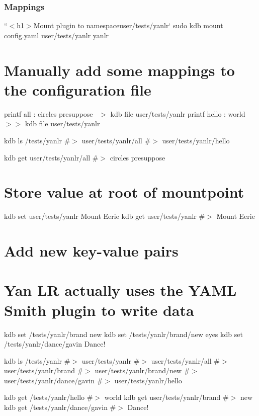 \subsubsection*{Mappings}

``{\ttfamily  $<$h1$>$Mount plugin to namespace}user/tests/yanlr` sudo kdb mount config.\+yaml user/tests/yanlr yanlr

\section*{Manually add some mappings to the configuration file}

printf \textquotesingle{}all \+: circles presuppose~\newline
\textquotesingle{} $>$ {\ttfamily kdb file user/tests/yanlr} printf \textquotesingle{}hello \+: world~\newline
\textquotesingle{} $>$$>$ {\ttfamily kdb file user/tests/yanlr}

kdb ls /tests/yanlr \#$>$ user/tests/yanlr/all \#$>$ user/tests/yanlr/hello

kdb get user/tests/yanlr/all \#$>$ circles presuppose

\section*{Store value at root of mountpoint}

kdb set user/tests/yanlr \textquotesingle{}Mount Eerie\textquotesingle{} kdb get user/tests/yanlr \#$>$ Mount Eerie

\section*{Add new key-\/value pairs}

\section*{Yan LR actually uses the Y\+A\+ML Smith plugin to write data}

kdb set /tests/yanlr/brand new kdb set /tests/yanlr/brand/new eyes kdb set /tests/yanlr/dance/gavin \textquotesingle{}Dance!\textquotesingle{}

kdb ls /tests/yanlr \#$>$ user/tests/yanlr \#$>$ user/tests/yanlr/all \#$>$ user/tests/yanlr/brand \#$>$ user/tests/yanlr/brand/new \#$>$ user/tests/yanlr/dance/gavin \#$>$ user/tests/yanlr/hello

kdb get /tests/yanlr/hello \#$>$ world kdb get user/tests/yanlr/brand \#$>$ new kdb get /tests/yanlr/dance/gavin \#$>$ Dance!

